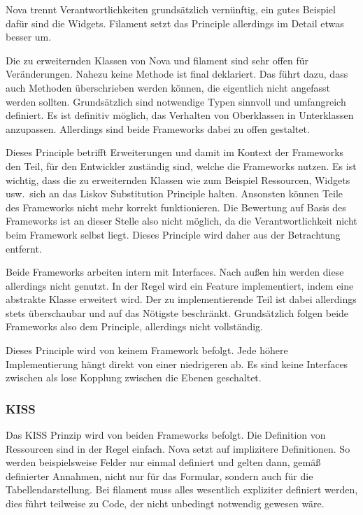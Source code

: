 Nova trennt Verantwortlichkeiten grundsätzlich vernünftig, ein gutes Beispiel dafür sind die Widgets.
Filament setzt das Principle allerdings im Detail etwas besser um.

Die zu erweiternden Klassen von Nova und filament sind sehr offen für Veränderungen.
Nahezu keine Methode ist final deklariert.
Das führt dazu, dass auch Methoden überschrieben werden können, die eigentlich nicht angefasst werden sollten.
Grundsätzlich sind notwendige Typen sinnvoll und umfangreich definiert.
Es ist definitiv möglich, das Verhalten von Oberklassen in Unterklassen anzupassen.
Allerdings sind beide Frameworks dabei zu offen gestaltet.

Dieses Principle betrifft Erweiterungen und damit im Kontext der Frameworks den Teil, für den Entwickler zuständig sind, welche die Frameworks nutzen.
Es ist wichtig, dass die zu erweiternden Klassen wie zum Beispiel Ressourcen, Widgets usw.\ sich an das Liskov Substitution Principle halten.
Ansonsten können Teile des Frameworks nicht mehr korrekt funktionieren.
Die Bewertung auf Basis des Frameworks ist an dieser Stelle also nicht möglich, da die Verantwortlichkeit nicht beim Framework selbst liegt.
Dieses Principle wird daher aus der Betrachtung entfernt.

Beide Frameworks arbeiten intern mit Interfaces.
Nach außen hin werden diese allerdings nicht genutzt.
In der Regel wird ein Feature implementiert, indem eine abstrakte Klasse erweitert wird.
Der zu implementierende Teil ist dabei allerdings stets überschaubar und auf das Nötigste beschränkt.
Grundsätzlich folgen beide Frameworks also dem Principle, allerdings nicht vollständig.

Dieses Principle wird von keinem Framework befolgt.
Jede höhere Implementierung hängt direkt von einer niedrigeren ab.
Es sind keine Interfaces zwischen als lose Kopplung zwischen die Ebenen geschaltet.

\newpage

\subsubsection{KISS}
Das KISS Prinzip wird von beiden Frameworks befolgt.
Die Definition von Ressourcen sind in der Regel einfach.
Nova setzt auf implizitere Definitionen.
So werden beispielsweise Felder nur einmal definiert und gelten dann, gemäß definierter Annahmen, nicht nur für das Formular, sondern auch für die Tabellendarstellung.
Bei filament muss alles wesentlich expliziter definiert werden, dies führt teilweise zu Code, der nicht unbedingt notwendig gewesen wäre.

